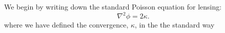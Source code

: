 We begin by writing down the standard Poisson equation for lensing:
\begin{equation}
\nabla^2 \phi = 2 \kappa.
\end{equation}
where we have defined the convergence, $\kappa$, in the the standard way
  